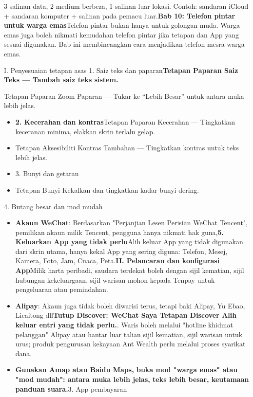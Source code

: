 
3 salinan data, 2 medium berbeza, 1 salinan luar lokasi. Contoh: sandaran iCloud + sandaran komputer + salinan pada pemacu luar.\textbf{Bab 10: Telefon pintar untuk warga emas}Telefon pintar bukan hanya untuk golongan muda. Warga emas juga boleh nikmati kemudahan telefon pintar jika tetapan dan App yang sesuai digunakan. Bab ini membincangkan cara menjadikan telefon mesra warga emas.

\begin{tcbinfo}{I. Penyesuaian tetapan asas}
1. Saiz teks dan paparan\textbf{Tetapan Paparan Saiz Teks — Tambah saiz teks sistem.}

Tetapan Paparan Zoom Paparan — Tukar ke “Lebih Besar” untuk antara muka lebih jelas.

\begin{itemize}
  \item \textbf{2. Kecerahan dan kontras}Tetapan Paparan Kecerahan — Tingkatkan keceranan minima, elakkan skrin terlalu gelap.
  \item Tetapan Aksesibiliti Kontras Tambahan — Tingkatkan kontras untuk teks lebih jelas.
  \item 3. Bunyi dan getaran
  \item Tetapan Bunyi Kekalkan dan tingkatkan kadar bunyi dering.
\end{itemize}

\end{tcbinfo}


4. Butang besar dan mod mudah

\begin{itemize}
  \item \textbf{Akaun WeChat}: Berdasarkan "Perjanjian Lesen Perisian WeChat Tencent", pemilikan akaun milik Tencent, pengguna hanya nikmati hak guna,\textbf{5. Keluarkan App yang tidak perlu}Alih keluar App yang tidak digunakan dari skrin utama, hanya kekal App yang sering diguna: Telefon, Mesej, Kamera, Foto, Jam, Cuaca, Peta.\textbf{II. Pelancaran dan konfigurasi App}Milik harta peribadi, saudara terdekat boleh dengan sijil kematian, sijil hubungan kekeluargaan, sijil warisan mohon kepada Tenpay untuk pengeluaran atau pemindahan.
  \item \textbf{Alipay}: Akaun juga tidak boleh diwarisi terus, tetapi baki Alipay, Yu Ebao, Licaitong dll\textbf{Tutup Discover: WeChat Saya Tetapan Discover Alih keluar entri yang tidak perlu.}. Waris boleh melalui "hotline khidmat pelanggan" Alipay atau hantar luar talian sijil kematian, sijil warisan untuk urus; produk pengurusan kekayaan Ant Wealth perlu melalui proses syarikat dana.
  \item \textbf{Gunakan Amap atau Baidu Maps, buka mod "warga emas" atau "mod mudah": antara muka lebih jelas, teks lebih besar, keutamaan panduan suara.}3. App pembayaran
\end{itemize}

